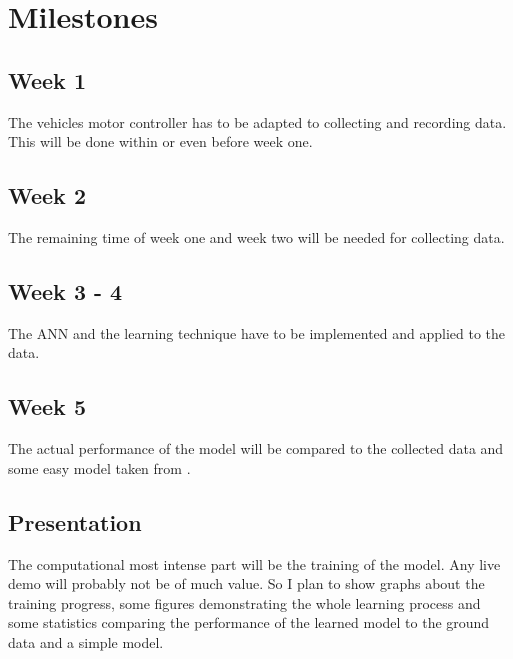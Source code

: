\documentclass[	DIV=calc,%
				paper=a4,%
				fontsize=11pt,%
				twocolumn]{scrartcl}	 %
\begin{document}
\section{Milestones}

	\subsection{Week 1}
	The vehicles motor controller has to be adapted to collecting and recording data.
	This will be done within or even before week one.
	
	\subsection{Week 2}
	The remaining time of week one and week two will be needed for collecting data.
	
	\subsection{Week 3 - 4}
	The ANN and the learning technique have to be implemented and applied to the data.
	
	\subsection{Week 5}
	The actual performance of the model will be compared to the collected data and some easy model taken from \cite{gaier2014evolving}.
	
	\subsection{Presentation}
	The computational most intense part will be the training of the model. 
	Any live demo will probably not be of much value.
	So I plan to show graphs about the training progress, some figures demonstrating the whole learning process and some statistics comparing the performance of the learned model to the ground data and a simple model.
	



\end{document}
